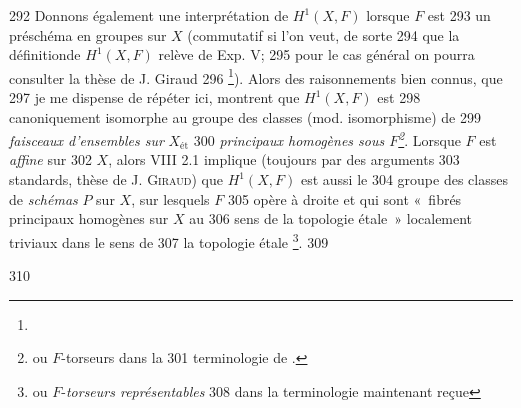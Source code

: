 \begin{enumerate}
   292	Donnons également une interprétation de $H^1(X, F)$ lorsque $F$ est
   293	un préschéma en groupes sur $X$ (commutatif si l'on veut, de sorte
   294	que la définition\pageoriginale de $H^{1}(X, F)$ relève de Exp. V;
   295	pour le cas général on pourra consulter la thèse de J. Giraud
   296	\footnote{}). Alors des raisonnements bien connus, que
   297	je me dispense de répéter ici, montrent que $H^1 (X, F)$ est
   298	canoniquement isomorphe au groupe des classes (mod. isomorphisme) de
   299	\emph{faisceaux d'ensembles sur} $X_{\text{ét}}$
   300	  \emph{principaux homogènes sous $F$\footnote{ou $F$-torseurs dans la
   301	    terminologie de \loccit.}}. Lorsque $F$ est \emph{affine} sur
   302	$X$, alors  VIII 2.1 implique (toujours par des arguments
   303	standards, \cf thèse de J. \textsc{Giraud}) que $H^{1} (X, F)$ est aussi le
   304	groupe des classes de \emph{schémas} $P$ sur $X$, sur lesquels $F$
   305	opère à droite et qui sont « fibrés principaux homogènes sur $X$ au
   306	sens de la topologie étale » \ie localement triviaux dans le sens de
   307	la topologie étale \footnote{ou $F$-\emph{torseurs représentables}
   308	  dans la terminologie maintenant reçue}.
   309	 \end{enumerate}
   310	
